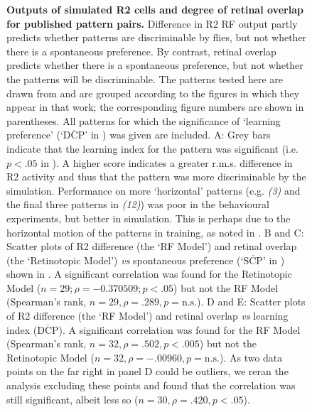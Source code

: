 \begin{figure}[htp]
	\caption{
		{\bf Outputs of simulated R2 cells and degree of retinal overlap for published pattern pairs.}
		Difference in R2 RF output partly predicts whether patterns are discriminable by flies, but not whether there is a spontaneous preference.
		By contrast, retinal overlap predicts whether there is a spontaneous preference, but not whether the patterns will be discriminable.
		The patterns tested here are drawn from \protect\cite{Ernst1999} and are grouped according to the figures in which they appear in that work; the corresponding figure numbers are shown in parentheses.
		All patterns for which the significance of `learning preference' (`$\overline{\mathrm{DCP}}$' in \protect\cite{Ernst1999}) was given are included.
		A: Grey bars indicate that the learning index for the pattern was significant (i.e. $p<.05$ in \protect\cite{Ernst1999}).
		A higher score indicates a greater r.m.s. difference in R2 activity and thus that the pattern was more discriminable by the simulation.
		Performance on more `horizontal' patterns (e.g. \emph{(3)} and the final three patterns in \emph{(12)}) was poor in the behavioural experiments, but better in simulation.
		This is perhaps due to the horizontal motion of the patterns in training, as noted in \protect\cite{Ernst1999}.
		B and C: Scatter plots of R2 difference (the `RF Model') and retinal overlap (the `Retinotopic Model') \emph{vs} spontaneous preference (`$\overline{\mathrm{SCP}}$' in \protect\cite{Ernst1999}) shown in \protect\cite{Ernst1999}.
		A significant correlation was found for the Retinotopic Model ($n=29; \rho = -0.370509; p < .05$) but not the RF Model (Spearman's rank, $n=29, \rho=.289, p=\mathrm{n.s.}$).
		D and E: Scatter plots of R2 difference (the `RF Model') and retinal overlap \emph{vs} learning index ($\overline{\mathrm{DCP}}$).
		A significant correlation was found for the RF Model (Spearman's rank, $n=32, \rho=.502, p < .005$) but not the Retinotopic Model ($n=32, \rho=-.00960, p=\mathrm{n.s.}$).
		As two data points on the far right in panel D could be outliers, we reran the analysis excluding these points and found that the correlation was still significant, albeit less so ($n=30, \rho=.420, p < .05$).
	}
	\label{fig:pattern}
\end{figure}

